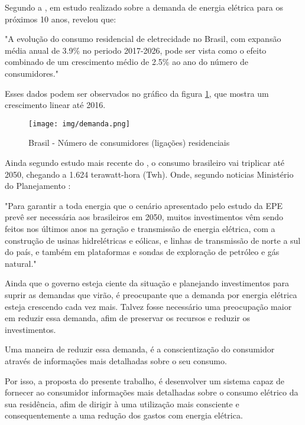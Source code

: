Segundo a , em estudo realizado sobre a demanda de energia elétrica para os próximos 10 anos, revelou que:
\begin{citacao}
"A evolução do consumo residencial de eletrecidade no Brasil, com expansão média anual de 3.9\% no periodo 2017-2026, pode ser vista como o efeito combinado de um crescimento médio de 2.5\% ao ano do número de consumidores."
\end{citacao}

Esses dados podem ser observados no gráfico da figura \ref{graf1}, que mostra um crescimento linear até 2016.

\begin{figure}[!ht]
    \centering
    \caption{Brasil - Número de consumidores (ligações) residenciais}
    \label{graf1}
    \texttt{[image: img/demanda.png]}
\end{figure}

Ainda segundo estudo mais recente do , o consumo brasileiro vai triplicar até 2050, chegando a 1.624 terawatt-hora (Twh). Onde, segundo noticias Ministério do Planejamento :
\begin{citacao}
"Para garantir a toda energia que o cenário apresentado pelo estudo da EPE prevê ser necessária aos brasileiros em 2050, muitos investimentos vêm sendo feitos nos últimos anos na geração e transmissão de energia elétrica, com a construção de usinas hidrelétricas e eólicas, e linhas de transmissão de norte a sul do país, e também em plataformas e sondas de exploração de petróleo e gás natural."
\end{citacao}

Ainda que o governo esteja ciente da situação e planejando investimentos para suprir as demandas que virão, é preocupante que a demanda por energia elétrica esteja crescendo cada vez mais. Talvez fosse necessário uma preocupação maior em reduzir essa demanda, afim de preservar os recursos e reduzir os investimentos.

Uma maneira de reduzir essa demanda, é a conscientização do consumidor através de informações mais detalhadas sobre o seu consumo.

Por isso, a proposta do presente trabalho, é desenvolver um sistema capaz de fornecer ao consumidor informações mais detalhadas sobre o consumo elétrico da sua residência, afim de dirigir à uma utilização mais consciente e consequentemente a uma redução dos gastos com energia elétrica.

